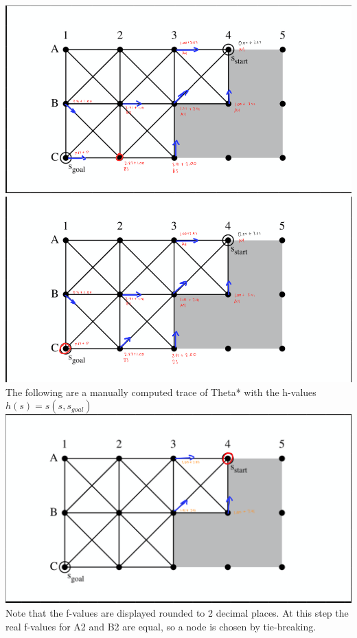 \documentclass[12pt]{article}
\begin{document}
{\\
\includegraphics{s_grid_a_3.png}
\\
\includegraphics{s_grid_a_4.png}
\\
The following are a manually computed trace of Theta* with the h-values $h(s) = s(s, s_{goal})$
\\
\includegraphics{s_grid_t_1.png}
\\
Note that the f-values are displayed rounded to 2 decimal places. At this step the real f-values for A2 and B2 are equal, so a node is chosen by tie-breaking.
}
\end{document}
